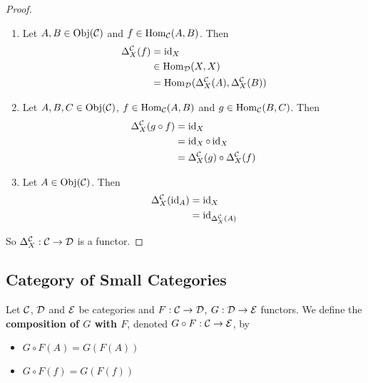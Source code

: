 \documentclass{book}
\begin{document}
	\begin{proof}\
		\begin{enumerate}
			\item Let $A, B \in \operatorname{Obj}(\mathcal{C})$ and $f \in \operatorname{Hom}_{\mathcal{C}}(A, B)$. Then 
			\begin{align*}
				\Delta^{\mathcal{C}}_X (f)
				& = \operatorname{id}_X \\
				& \in \operatorname{Hom}_{\mathcal{D}}(X, X) \\
				& = \operatorname{Hom}_{\mathcal{D}}(\Delta^{\mathcal{C}}_X (A), \Delta^{\mathcal{C}}_X (B))
			\end{align*}  
			\item Let $A,B,C \in \operatorname{Obj}(\mathcal{C})$, $f \in \operatorname{Hom}_{\mathcal{C}}(A, B)$ and $g \in \operatorname{Hom}_{\mathcal{C}}(B, C)$. Then 
			\begin{align*}
				\Delta^{\mathcal{C}}_X (g \circ f) 
				& = \operatorname{id}_X \\
				& = \operatorname{id}_X \circ \operatorname{id}_X \\
				& = \Delta^{\mathcal{C}}_X (g) \circ \Delta^{\mathcal{C}}_X (f)
			\end{align*} 
			\item Let $A \in \operatorname{Obj}(\mathcal{C})$. Then 
			\begin{align*}
				\Delta^{\mathcal{C}}_X (\operatorname{id}_A)
				& = \operatorname{id}_X \\
				& = \operatorname{id}_{\Delta^{\mathcal{C}}_X (A)}
			\end{align*}
		\end{enumerate}
		So $\Delta^{\mathcal{C}}_X : \mathcal{C} \rightarrow \mathcal{D}$ is a functor.
	\end{proof}


















	\subsection{Category of Small Categories}

	\begin{defn} 
		Let $\mathcal{C}$, $\mathcal{D}$ and $\mathcal{E}$ be categories and $F:\mathcal{C} \rightarrow \mathcal{D}$, $G: \mathcal{D} \rightarrow \mathcal{E}$ functors. We define the \textbf{composition of $G$ with $F$}, denoted $G \circ F: \mathcal{C} \rightarrow \mathcal{E}$, by 
		\begin{itemize}
			\item $G \circ F (A) = G(F(A))$
			\item $G \circ F (f) = G(F(f))$
		\end{itemize} 
	\end{defn}
	
\end{document}
